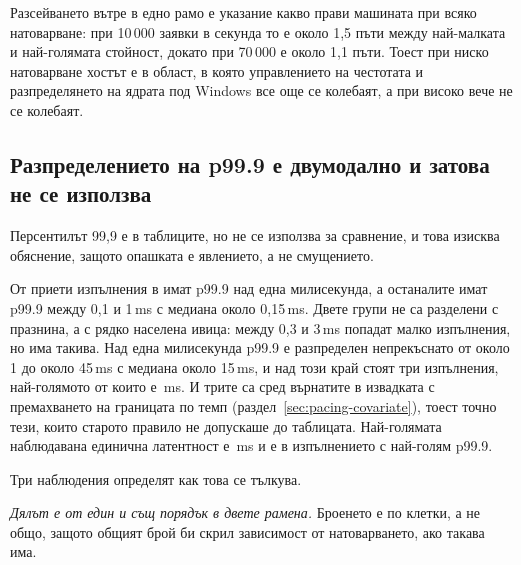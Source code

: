 Разсейването вътре в едно рамо е указание какво прави машината при всяко натоварване: при
10\,000 заявки в секунда то е около 1,5 пъти между най-малката и най-голямата стойност,
докато при 70\,000 е около 1,1 пъти. Тоест при ниско натоварване хостът е в област, в която
управлението на честотата и разпределянето на ядрата под Windows все още се колебаят, а при
високо вече не се колебаят.

\subsection{Разпределението на p99.9 е двумодално и затова не се използва}
\label{sec:tail}

Персентилът 99,9 е в таблиците, но не се използва за сравнение, и това изисква обяснение,
защото опашката е явлението, а не смущението.

От  приети изпълнения в   имат p99.9
над една милисекунда, а останалите имат p99.9 между 0,1 и 1\,ms с медиана около 0,15\,ms.
Двете групи не са разделени с празнина, а с рядко населена ивица: между 0,3 и 3\,ms попадат
малко изпълнения, но има такива. Над една милисекунда p99.9 е разпределен непрекъснато от
около 1 до около 45\,ms с медиана около 15\,ms, и над този край стоят три изпълнения,
най-голямото от които е \,ms. И трите са сред върнатите в извадката с
премахването на границата по темп (раздел~\ref{sec:pacing-covariate}), тоест точно тези, които
старото правило не допускаше до таблицата. Най-голямата наблюдавана единична латентност е
\,ms и е в изпълнението с най-голям p99.9.

Три наблюдения определят как това се тълкува.

\emph{Дялът е от един и същ порядък в двете рамена.} Броенето е по клетки, а не общо, защото
общият брой би скрил зависимост от натоварването, ако такава има.


